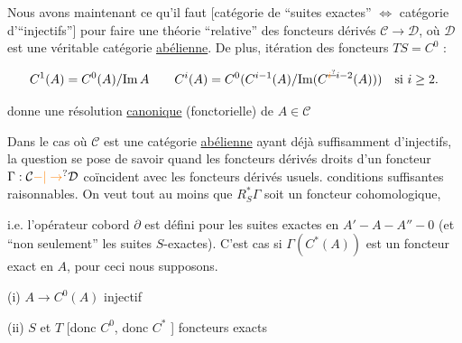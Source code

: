 Nous avons maintenant ce qu'il faut [catégorie de ``suites exactes'' $\Longleftrightarrow$ catégorie d'``injectifs''] pour faire une théorie ``relative'' des foncteurs dérivés $\mathcal C\to\mathcal D$, où $\mathcal D$ est une véritable catégorie \uline{abélienne}. De plus,  itération des foncteurs $TS=C^0$ :

\[
C^1(A)=C^0(A)/\mathrm{Im}\,A\qquad C^i(A)=C^0(C^{i-1}(A)/\mathrm{Im}(C^{\deleted{\unsure{i}}i-2}(A)))\quad\text{si }i\geq2 .
\]

donne une résolution  \uline{canonique} (fonctorielle) de $A\in\mathcal C$


Dans le cas où $\mathcal C$ est une catégorie \uline{abélienne} ayant déjà suffisamment d'injectifs, la question se pose de savoir quand les foncteurs dérivés droits  d'un foncteur $\Gamma:\mathcal C\unsure{-|\to}\mathcal D$ coïncident avec les foncteurs dérivés usuels.   conditions suffisantes raisonnables. On veut tout au moins que $R_S^*\Gamma$ soit un foncteur cohomologique,


i.e. l'opérateur cobord $\partial$ est défini pour \uline{} les suites exactes en $A'-A-A''-0$ (et ``non seulement'' les suites $S$-exactes). C'est  cas si $\Gamma(C^*(A))$ est un foncteur exact en $A$, pour ceci nous supposons.


(i) $A\to C^0(A)$ injectif

(ii) $S$ et $T$ [donc $C^0$, donc  $C^*$ ] foncteurs exacts

